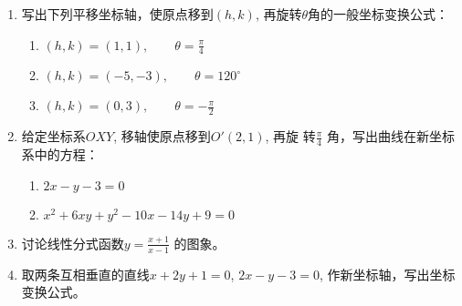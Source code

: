 \begin{ex}
\begin{enumerate}
    \item 写出下列平移坐标轴，使原点移到$(h,k)$, 再旋转$\theta$角的一般坐标变换公式：
\begin{enumerate}
    \item $(h,k)=(1,1),\qquad \theta=\frac{\pi}{4}$
    \item $(h,k)=(-5,-3),\qquad \theta=120^{\circ}$
    \item $(h,k)=(0,3),\qquad \theta=-\frac{\pi}{2}$
\end{enumerate}

\item 给定坐标系$OXY$, 移轴使原点移到$O'(2,1)$, 再旋
    转$\frac{\pi}{4}$
    角，写出曲线在新坐标系中的方程：
\begin{enumerate}
    \item $2x-y-3=0$
    \item $x^2+6xy+y^2-10x-14y+9=0$
\end{enumerate}
\item     讨论线性分式函数$y=\frac{x+1}{x-1}$
的图象。
\item 取两条互相垂直的直线$x+2y+1=0$, $2x-y-3=0$, 
作新坐标轴，写出坐标变换公式。
\end{enumerate}
\end{ex}

